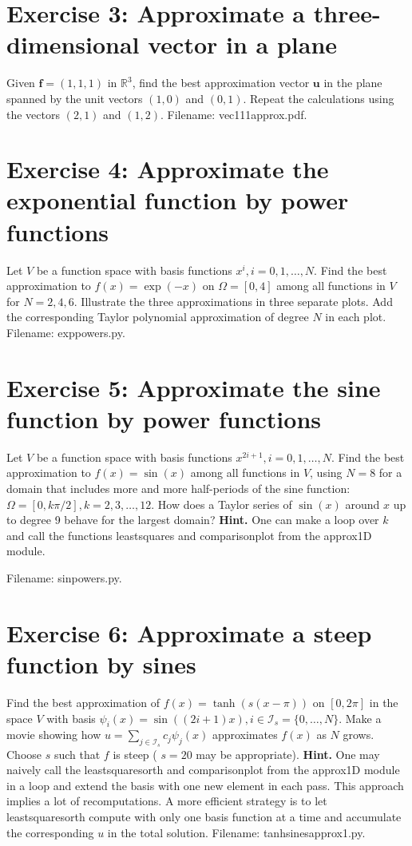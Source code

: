 \documentclass[../main.tex]{subfiles}
\begin{document}
\section*{Exercise 3: Approximate a three-dimensional vector in a plane}
\label{sec:sec_10_3}
\noindent Given $\boldsymbol{f}=(1,1,1)$ in $\mathbb{R}^{3}$, find the best approximation vector $\boldsymbol{u}$ in the plane spanned by the unit vectors $(1,0)$ and $(0,1)$. Repeat the calculations using the vectors $(2,1)$ and $(1,2)$. Filename: vec111\textunderscore approx.pdf.
\bigbreak
\section*{Exercise 4: Approximate the exponential function by power functions}
\label{sec:sec_10_4}
\noindent Let $V$ be a function space with basis functions $x^{i}, i=0,1, \ldots, N$. Find the best approximation to $f(x)=\exp (-x)$ on $\Omega=[0,4]$ among all functions in $V$ for $N=2,4,6$. Illustrate the three approximations in three separate plots. Add the corresponding Taylor polynomial approximation of degree $N$ in each plot. Filename: exp\textunderscore powers.py.
\bigbreak
\section*{Exercise 5: Approximate the sine function by power functions}
\label{sec:sec_10_5}
\noindent Let $V$ be a function space with basis functions $x^{2 i+1}, i=0,1, \ldots, N$. Find the best approximation to $f(x)=\sin (x)$ among all functions in $V$, using $N=8$ for a domain that includes more and more half-periods of the sine function: $\Omega=[0, k \pi / 2], k=2,3, \ldots, 12$. How does a Taylor series of $\sin (x)$ around $x$ up to degree 9 behave for the largest domain?
\bigbreak
\noindent \textbf{Hint.} One can make a loop over $k$ and call the functions least\textunderscore squares and comparison\textunderscore plot from the approx1D module.

Filename: sin\textunderscore powers.py.
\bigbreak
\section*{Exercise 6: Approximate a steep function by sines}
\label{sec:sec_10_6}
\noindent Find the best approximation of $f(x)=\tanh (s(x-\pi))$ on $[0,2 \pi]$ in the space $V$ with basis $\psi_{i}(x)=\sin ((2 i+1) x), i \in \mathcal{I}_{s}=\{0, \ldots, N\}$. Make a movie showing how $u=\sum_{j \in \mathcal{I}_{s}} c_{j} \psi_{j}(x)$ approximates $f(x)$ as $N$ grows. Choose $s$ such that $f$ is steep ( $s=20$ may be appropriate).
\bigbreak
\noindent \textbf{Hint.} One may naively call the least\textunderscore squares\textunderscore orth and comparison\textunderscore plot from the approx1D module in a loop and extend the basis with one new element in each pass. This approach implies a lot of recomputations. A more efficient strategy is to let least\textunderscore squares\textunderscore orth compute with only one basis function at a time and accumulate the corresponding $u$ in the total solution.
Filename: tanh\textunderscore sines\textunderscore approx1.py.
\bigbreak
\end{document}
